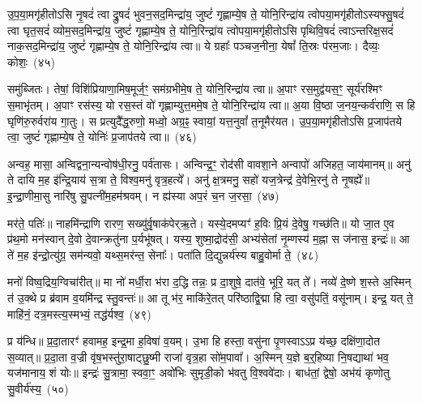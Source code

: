 {\anuvakamend[{अ॒ज॒य॒त् षट्च॑त्वारिꣳशच्च}]}%

उ॒प॒या॒मगृ॑हीतो\-ऽसि नृ॒षदं॑ त्वा द्रु॒षदं॑ भुवन॒सद॒मिन्द्रा॑य॒ जुष्टं॑ गृह्णाम्ये॒ष ते॒ योनि॒रिन्द्रा॑य त्वोपया॒मगृ॑हीतो\-ऽस्यफ्सु॒षदं॑ त्वा घृत॒सदं॑ व्योम॒सद॒मिन्द्रा॑य॒ जुष्टं॑ गृह्णाम्ये॒ष ते॒ योनि॒रिन्द्रा॑य त्वोपया॒मगृ॑हीतो\-ऽसि पृथिवि॒षदं॑ त्वा\-ऽन्तरिक्ष॒सदं॑ नाक॒सद॒मिन्द्रा॑य॒ जुष्टं॑ गृह्णाम्ये॒ष ते॒ योनि॒रिन्द्रा॑य त्वा॥ ये ग्रहाः᳚ पञ्चज॒नीना॒ येषां᳚ ति॒स्रः प॑रम॒जाः। दैव्यः॒ कोशः॒~(४५)\ip

समु॑ब्जितः। तेषां॒ विशि॑प्रियाणा॒मिष॒मूर्ज॒ꣳ॒ सम॑ग्रभीमे॒ष ते॒ योनि॒रिन्द्रा॑य त्वा॥ अ॒पाꣳ रस॒मुद्व॑यस॒ꣳ॒ सूर्य॑रश्मिꣳ स॒माभृ॑तम्। अ॒पाꣳ रस॑स्य॒ यो रस॒स्तं वो॑ गृह्णाम्युत्त॒ममे॒ष ते॒ योनि॒रिन्द्रा॑य त्वा॥ अ॒या वि॒ष्ठा ज॒नय॒न्कर्व॑राणि॒ स हि घृणि॑रु॒रुर्वरा॑य गा॒तुः। स प्रत्युदै᳚द्ध॒रुणो॒ मध्वो॒ अग्र॒ꣴ॒ स्वायां॒ यत्त॒नुवां᳚ त॒नूमैर॑यत। उ॒प॒या॒मगृ॑हीतो\-ऽसि प्र॒जा\-प॑तये त्वा॒ जुष्टं॑ गृह्णाम्ये॒ष ते॒ योनिः॑ प्र॒जा\-प॑तये त्वा॥~(४६)\ip

{\anuvakamend[{कोश॑स्त॒नुवां॒ त्रयो॑दश च}]}%

अन्वह॒ मासा॒ अन्विद्वना॒न्यन्वोष॑धी॒रनु॒ पर्व॑तासः। अन्विन्द्र॒ꣳ॒ रोद॑सी वावशा॒ने अन्वापो॑ अजिहत॒ जाय॑मानम्॥ अनु॑ ते दायि म॒ह इ॑न्द्रि॒याय॑ स॒त्रा ते॒ विश्व॒मनु॑ वृत्र॒हत्ये᳚। अनु॑ क्ष॒त्रमनु॒ सहो॑ यज॒त्रेन्द्र॑ दे॒वेभि॒रनु॑ ते नृ॒षह्ये᳚॥ इ॒न्द्रा॒णीमा॒सु नारि॑षु सु॒पत्नी॑म॒हम॑श्रवम्। न ह्य॑स्या अप॒रं च॒न ज॒रसा॒~(४७)\ip

मर॑ते॒ पतिः॑॥ नाहमि॑न्द्राणि रारण॒ सख्यु॑र्वृ॒षाक॑पेर्‌ऋ॒ते। यस्ये॒दमप्यꣳ॑ ह॒विः प्रि॒यं दे॒वेषु॒ गच्छ॑ति॥ यो जा॒त ए॒व प्र॑थ॒मो मन॑स्वान् दे॒वो दे॒वान्क्रतु॑ना प॒र्यभू॑षत्। यस्य॒ शुष्मा॒द्रोद॑सी॒ अभ्य॑सेतां नृ॒म्णस्य॑ म॒ह्ना स ज॑नास॒ इन्द्रः॑॥ आ ते॑ म॒ह इ॑न्द्रो॒त्यु॑ग्र॒ सम॑न्यवो॒ यथ्स॒मर॑न्त॒ सेनाः᳚। पता॑ति दि॒द्युन्नर्य॑स्य बाहु॒वोर्मा ते॒~(४८)\ip

मनो॑ विष्व॒द्रिय॒ग्विचा॑रीत्॥ मा नो॑ मर्धी॒रा भ॑रा द॒द्धि तन्नः॒ प्र दा॒शुषे॒ दात॑वे॒ भूरि॒ यत् ते᳚। नव्ये॑ दे॒ष्णे श॒स्ते अ॒स्मिन् त॑ उ॒क्थे प्र ब्र॑वाम व॒यमि॑न्द्र स्तु॒वन्तः॑॥ आ तू भ॑र॒ माकि॑रे॒तत् परि॑ष्ठाद्वि॒द्मा हि त्वा॒ वसु॑पतिं॒ वसू॑नाम्। इन्द्र॒ यत् ते॒ माहि॑नं॒ दत्र॒मस्त्य॒स्मभ्यं॒ तद्ध॑र्यश्व॒~(४९)\ip

प्र य॑न्धि॥ प्र॒दा॒तारꣳ॑ हवामह॒ इन्द्र॒मा ह॒विषा॑ व॒यम्। उ॒भा हि हस्ता॒ वसु॑ना पृ॒णस्वा\-ऽऽ\-प्र य॑च्छ॒ दक्षि॑णा॒दोत स॒व्यात्॥ प्र॒दा॒ता व॒ज्री वृ॑ष॒भस्तु॑रा॒षाट्छु॒ष्मी राजा॑ वृत्र॒हा सो॑म॒पावा᳚। अ॒स्मिन् य॒ज्ञे ब॒र्॒\mbox{}हिष्या नि॒षद्याथा॑ भव॒ यज॑मानाय॒ शं योः॥ इन्द्रः॑ सु॒त्रामा॒ स्ववा॒ꣳ॒ अवो॑भिः सुमृडी॒को भ॑वतु वि॒श्ववे॑दाः। बाध॑तां॒ द्वेषो॒ अभ॑यं कृणोतु सु॒वीर्य॑स्य॒~(५०)\ip

